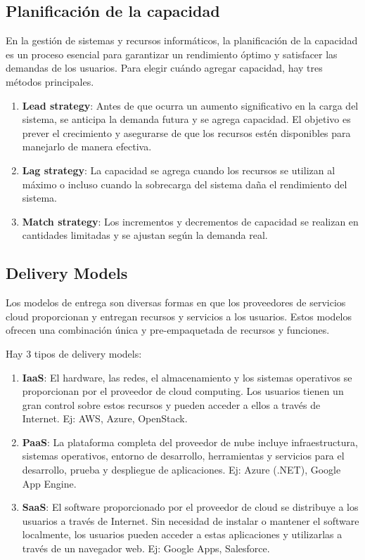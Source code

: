 \documentclass{article}
\begin{document}
		\subsection{Planificación de la capacidad}
		En la gestión de sistemas y recursos informáticos, la planificación de la capacidad es un proceso esencial para garantizar un rendimiento óptimo y satisfacer las demandas de los usuarios. Para elegir cuándo agregar capacidad, hay tres métodos principales.
		\begin{enumerate}
			
			\item {\textbf{Lead strategy}}: Antes de que ocurra un aumento significativo en la carga del sistema, se anticipa la demanda futura y se agrega capacidad. El objetivo es prever el crecimiento y asegurarse de que los recursos estén disponibles para manejarlo de manera efectiva.
			
			\item {\textbf{Lag strategy}}: La capacidad se agrega cuando los recursos se utilizan al máximo o incluso cuando la sobrecarga del sistema daña el rendimiento del sistema.
			
			\item {\textbf{Match strategy}}: Los incrementos y decrementos de capacidad se realizan en cantidades limitadas y se ajustan según la demanda real.
			
		\end{enumerate}
		
		\subsection{Delivery Models}
		Los modelos de entrega son diversas formas en que los proveedores de servicios cloud proporcionan y entregan recursos y servicios a los usuarios. Estos modelos ofrecen una combinación única y pre-empaquetada de recursos y funciones.
		
		Hay 3 tipos de delivery models:
		\begin{enumerate}
			
			\item {\textbf{IaaS}}: El hardware, las redes, el almacenamiento y los sistemas operativos se proporcionan por el proveedor de cloud computing. Los usuarios tienen un gran control sobre estos recursos y pueden acceder a ellos a través de Internet. Ej: AWS, Azure, OpenStack.
			
			\item {\textbf{PaaS}}: La plataforma completa del proveedor de nube incluye infraestructura, sistemas operativos, entorno de desarrollo, herramientas y servicios para el desarrollo, prueba y despliegue de aplicaciones. Ej: Azure (.NET), Google App Engine.
			
			\item {\textbf{SaaS}}: El software proporcionado por el proveedor de cloud se distribuye a los usuarios a través de Internet. Sin necesidad de instalar o mantener el software localmente, los usuarios pueden acceder a estas aplicaciones y utilizarlas a través de un navegador web. Ej: Google Apps, Salesforce.
			
		\end{enumerate}
		
\end{document}
